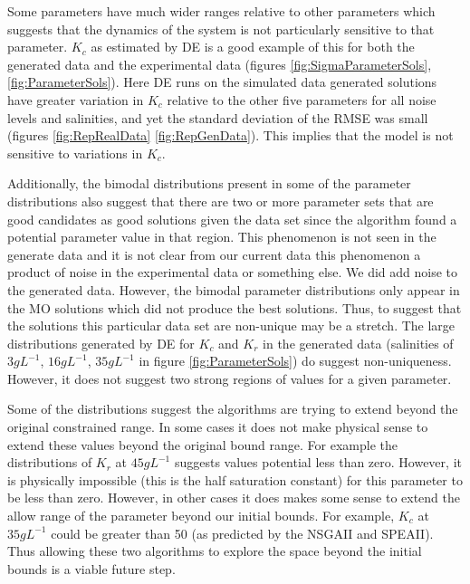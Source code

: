 \documentclass[twocolumn, 9pt]{article}
\begin{document}

\indent{} Some parameters have much wider ranges relative to other parameters which suggests that the dynamics of the system is not particularly sensitive to that parameter. $K_c$ as estimated by DE is a good example of this for both the generated data and the experimental data (figures \ref{fig:SigmaParameterSols}, \ref{fig:ParameterSols}). Here DE runs on the simulated data generated solutions have greater variation in $K_c$ relative to the other five parameters for all noise levels and salinities, and yet the standard deviation of the RMSE was small (figures \ref{fig:RepRealData} \ref{fig:RepGenData}). This implies that the model is not sensitive to variations in $K_c$. 

\indent{} Additionally, the bimodal distributions present in some of the parameter distributions also suggest that there are two or more parameter sets that are good candidates as good solutions given the data set since the algorithm found a potential parameter value in that region. This phenomenon is not seen in the generate data and it is not clear from our current data this phenomenon a product of noise in the experimental data or something else. We did add noise to the generated data. However, the bimodal parameter distributions only appear in the MO solutions which did not produce the best solutions. Thus, to suggest that the solutions this particular data set are non-unique may be a stretch. The large distributions generated by DE for $K_c$ and $K_r$ in the generated data (salinities of $3 gL^{-1}$, $16 gL^{-1}$, $35 gL^{-1}$ in figure \ref{fig:ParameterSols}) do suggest non-uniqueness. However, it does not suggest two strong regions of values for a given parameter. 

\indent{} Some of the distributions suggest the algorithms are trying to extend beyond the original constrained range. In some cases it does not make physical sense to extend these values beyond the original bound range. For example the distributions of $K_r$ at $45 gL^{-1}$ suggests values potential less than zero. However, it is physically impossible (this is the half saturation constant) for this parameter to be less than zero. However, in other cases it does makes some sense to extend the allow range of the parameter beyond our initial bounds. For example, $K_c$ at $35 gL^{-1}$ could be greater than 50 (as predicted by the NSGAII and SPEAII). Thus allowing these two algorithms to explore the space beyond the initial bounds is a viable future step.
\end{document}
